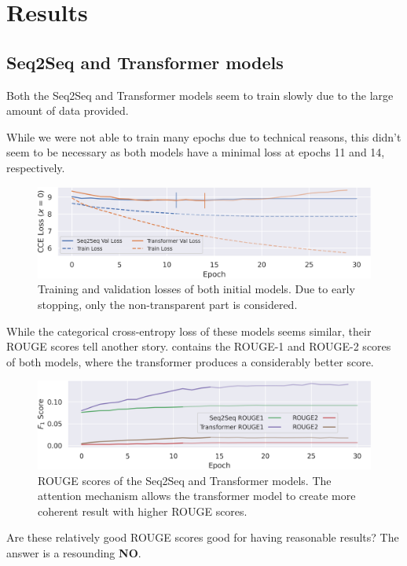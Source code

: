 \section{Results}

\subsection{Seq2Seq and Transformer models}
Both the Seq2Seq and Transformer models seem to train slowly due to the large amount of data provided.

While we were not able to train many epochs due to technical reasons, this didn't seem to be necessary as both models have a minimal loss at epochs 11 and 14, respectively.

\begin{figure}[h]
	\includegraphics[width = \textwidth]{baseline_losses.png}
	\caption{Training and validation losses of both initial models. Due to early stopping, only the non-transparent part is considered.}
\end{figure}

While the categorical cross-entropy loss of these models seems similar, their ROUGE scores tell another story.
 contains the ROUGE-1 and ROUGE-2 scores of both models, where the transformer produces a considerably better score.

\begin{figure}[h]
	\includegraphics[width = \textwidth]{baseline_rouges.png}
	\caption{ROUGE scores of the Seq2Seq and Transformer models. The attention mechanism allows the transformer model to create more coherent result with higher ROUGE scores.}
	\label{baseline_rouges}
\end{figure}

Are these relatively good ROUGE scores good for having reasonable results?
The answer is a resounding \textbf{NO}.

